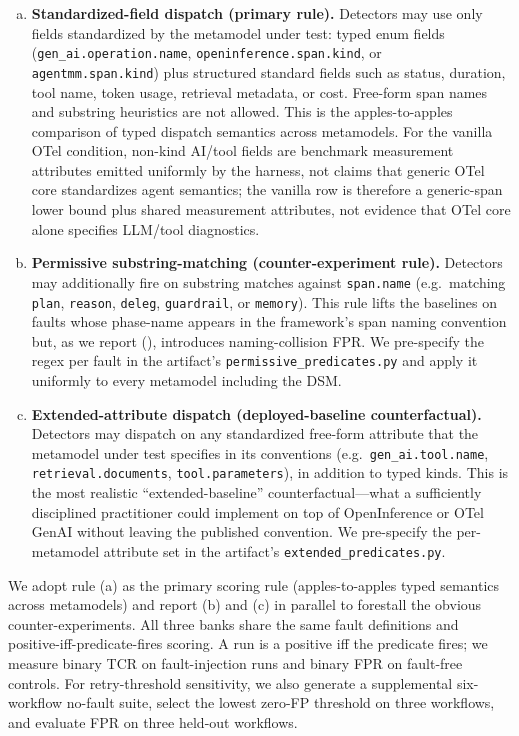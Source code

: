 \documentclass[a4paper,UKenglish,cleveref,autoref,thm-restate]{lipics-v2021}
\begin{document}
\begin{enumerate}[(a)]
\item \textbf{Standardized-field dispatch (primary rule).}  Detectors
  may use only fields standardized by the metamodel under test:
  typed enum fields (\texttt{gen\_ai.operation.name},
  \texttt{openinference.span.kind}, or \texttt{agentmm.span.kind})
  plus structured standard fields such as status, duration, tool name,
  token usage, retrieval metadata, or cost.  Free-form span names and
  substring heuristics are not allowed.  This is the apples-to-apples
  comparison of typed dispatch semantics across metamodels. For the
  vanilla OTel condition, non-kind AI/tool fields are benchmark
  measurement attributes emitted uniformly by the harness, not claims
  that generic OTel core standardizes agent semantics; the vanilla row
  is therefore a generic-span lower bound plus shared measurement
  attributes, not evidence that OTel core alone specifies LLM/tool
  diagnostics.
\item \textbf{Permissive substring-matching (counter-experiment
  rule).}  Detectors may additionally fire on substring matches
  against \texttt{span.name} (e.g.\ matching \texttt{plan},
  \texttt{reason}, \texttt{deleg}, \texttt{guardrail}, or
  \texttt{memory}).  This rule lifts
  the baselines on faults whose phase-name appears in the framework's
  span naming convention but, as we report (),
  introduces naming-collision FPR.  We pre-specify the regex per
  fault in the artifact's \texttt{permissive\_predicates.py} and
  apply it uniformly to every metamodel including the DSM.
\item \textbf{Extended-attribute dispatch (deployed-baseline
  counterfactual).}  Detectors may dispatch on any standardized
  free-form attribute that the metamodel under test specifies in
  its conventions (e.g.\ \texttt{gen\_ai.tool.name},
  \texttt{retrieval.documents}, \texttt{tool.parameters}), in
  addition to typed kinds.  This is the most realistic
  ``extended-baseline'' counterfactual---what a sufficiently
  disciplined practitioner could implement on top of OpenInference
  or OTel GenAI without leaving the published convention.  We
  pre-specify the per-metamodel attribute set in the artifact's
  \texttt{extended\_predicates.py}.
\end{enumerate}

\noindent We adopt rule (a) as the primary scoring rule (apples-to-apples
typed semantics across metamodels) and report (b) and (c) in parallel
to forestall the obvious counter-experiments.  All three banks share
the same fault definitions and positive-iff-predicate-fires scoring.
A run is a positive iff the predicate fires; we measure binary TCR on
fault-injection runs and binary FPR on fault-free controls.
For retry-threshold sensitivity, we also generate a supplemental
six-workflow no-fault suite, select the lowest zero-FP threshold on
three workflows, and evaluate FPR on three held-out workflows.
\end{document}
